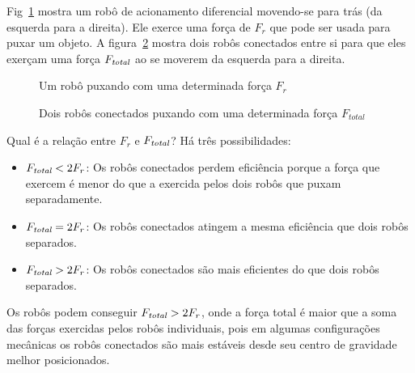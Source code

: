 Fig~\ref{fig.pulling1} mostra um robô de acionamento diferencial movendo-se para trás (da esquerda para a direita). Ele exerce uma força de $F_r$ que pode ser usada para puxar um objeto. A figura~\ref{fig.pulling2} mostra dois robôs conectados entre si para que eles exerçam uma força $F_{\textit{\scriptsize total}}$ ao se moverem da esquerda para a direita.

\begin{figure}
\begin{center}
\caption{Um robô puxando com uma determinada força $F_r$}\label{fig.pulling1}
\end{center}
\end{figure}

\begin{figure}
\begin{center}
\caption{Dois robôs conectados puxando com uma determinada força $F_{total}$}\label{fig.pulling2}
\end{center}
\end{figure}

Qual é a relação entre $F_r$ e $F_{\textit{\scriptsize total}}$? Há três possibilidades:
\begin{itemize}
\item $F_{\textit{\scriptsize total}} < 2 F_r$: Os robôs conectados perdem eficiência porque a força que exercem é menor do que a exercida pelos dois robôs que puxam separadamente.
\item $F_{\textit{\scriptsize total}} = 2 F_r$: Os robôs conectados atingem a mesma eficiência que dois robôs separados.
\item $F_{\textit{\scriptsize total}} > 2 F_r$: Os robôs conectados são mais eficientes do que dois robôs separados.
\end{itemize}
Os robôs podem conseguir $F_{\textit{\scriptsize total}} > 2 F_r$, onde a força total é maior que a soma das forças exercidas pelos robôs individuais, pois em algumas configurações mecânicas os robôs conectados são mais estáveis desde seu centro de gravidade melhor posicionados. 


